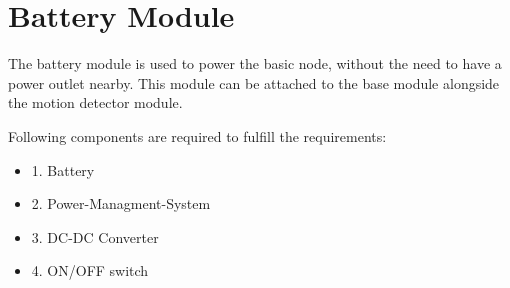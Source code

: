 \vspace{4cm}
\section{Battery Module} 

The battery module is used to power the basic node, without the need
to have a power outlet nearby. This module 
can be attached to the base module alongside the motion detector module.

Following components are required to fulfill the requirements:

    \begin{itemize}
        \item 1. Battery
        \item 2. Power-Managment-System
        \item 3. DC-DC Converter
        \item 4. ON/OFF switch
    \end{itemize}





